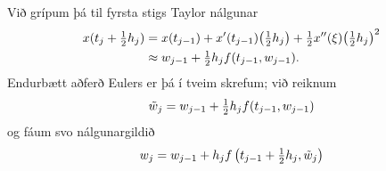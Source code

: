 \documentclass[letterpaper,10pt,icelandic]{sphinxmanual}
\begin{document}
Við grípum þá til fyrsta stigs Taylor nálgunar
\begin{gather}
\begin{split}\begin{aligned}
x(t_j+\tfrac 12 h_j)&=x(t_{j-1})+x'(t_{j-1})\big(\tfrac 12 h_j \big)
+\tfrac 12x''(\xi)\big(\tfrac 12 h_j \big)^2\\
&\approx w_{j-1}+\tfrac 12 h_jf(t_{j-1},w_{j-1}).\end{aligned}\end{split}\notag
\end{gather}
Endurbætt aðferð Eulers er þá í tveim skrefum; við reiknum
\begin{gather}
\begin{split}\tilde w_j = w_{j-1} + \tfrac 12 h_j f(t_{j-1},w_{j-1})\end{split}\notag
\end{gather}
og fáum svo nálgunargildið
\begin{gather}
\begin{split}w_j = w_{j-1} + h_jf\left(
    t_{j-1}+\tfrac 12 h_j,\tilde w_j\right)\end{split}\notag
\end{gather}
\end{document}
